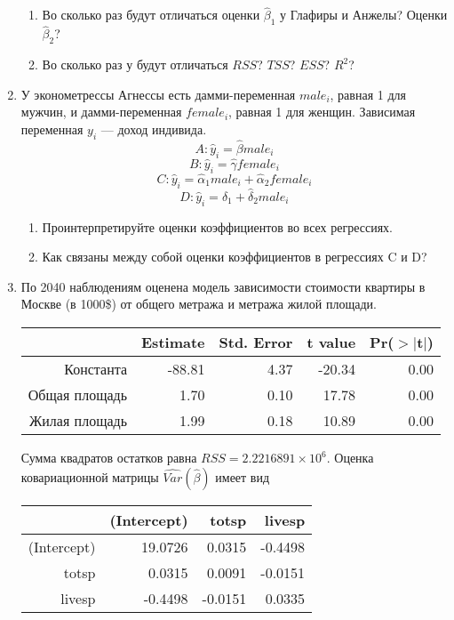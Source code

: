 \documentclass[12pt]{article}\usepackage[]{graphicx}\usepackage[svgnames]{xcolor}
\def \hb{\hat{\beta}}
\def \hy{\hat{y}}
\begin{document}
\begin{enumerate}
\begin{enumerate}
\item Во сколько раз будут отличаться оценки $\hb_1$ у Глафиры и Анжелы? Оценки $\hb_2$?
\item Во сколько раз у будут отличаться $RSS$? $TSS$? $ESS$? $R^2$?
\end{enumerate}


\item У эконометрессы Агнессы есть дамми-переменная $male_i$, равная 1 для мужчин, и дамми-переменная $female_i$, равная 1 для женщин. Зависимая переменная $y_i$ — доход индивида.
\[
A: \hy_i = \hat{\beta}male_i
\]
\[
B: \hy_i = \hat{\gamma}female_i
\]
\[
C: \hy_i = \hat{\alpha}_1male_i+\hat{\alpha}_2 female_i
\]
\[
D: \hy_i =  \hat{\delta}_1 + \hat{\delta}_2male_i
\]

\begin{enumerate}
\item Проинтерпретируйте оценки коэффициентов во всех регрессиях.
\item Как связаны между собой оценки коэффициентов в регрессиях C и D?
\end{enumerate}


\newpage

\item По 2040 наблюдениям оценена модель зависимости стоимости квартиры в Москве (в 1000\$) от общего метража и метража жилой площади.
\begin{table}[ht]
\centering
\begin{tabular}{rrrrr}
  \hline
 & Estimate & Std. Error & t value & Pr($>$$|$t$|$) \\ 
  \hline
Константа & -88.81 & 4.37 & -20.34 & 0.00 \\ 
  Общая площадь & 1.70 & 0.10 & 17.78 & 0.00 \\ 
  Жилая площадь & 1.99 & 0.18 & 10.89 & 0.00 \\ 
   \hline
\end{tabular}
\end{table}


Сумма квадратов остатков равна $RSS=\ensuremath{2.2216891\times 10^{6}}$. Оценка ковариационной матрицы $\widehat{Var}(\hat{\beta})$ имеет вид
\begin{table}[ht]
\centering
\begin{tabular}{rrrr}
  \hline
 & (Intercept) & totsp & livesp \\ 
  \hline
(Intercept) & 19.0726 & 0.0315 & -0.4498 \\ 
  totsp & 0.0315 & 0.0091 & -0.0151 \\ 
  livesp & -0.4498 & -0.0151 & 0.0335 \\ 
   \hline
\end{tabular}
\end{table}



\end{enumerate}
\end{document}
